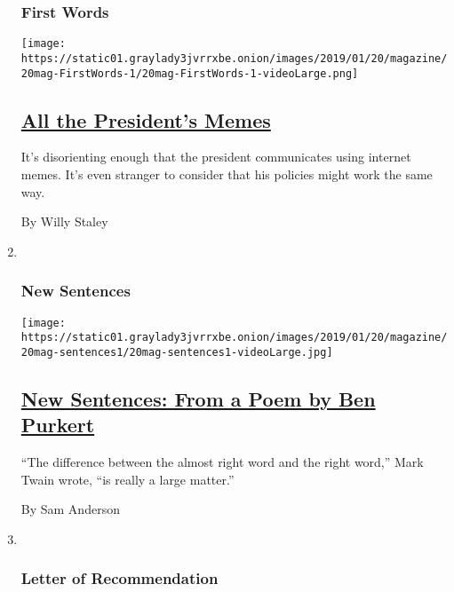 \begin{enumerate}
{  \subsubsection{First Words}\label{first-words}}

  \texttt{[image: https://static01.graylady3jvrrxbe.onion/images/2019/01/20/magazine/20mag-FirstWords-1/20mag-FirstWords-1-videoLarge.png]}

  \hypertarget{all-the-presidents-memes}{%
  \subsection{\texorpdfstring{\href{/2019/01/14/magazine/all-the-presidents-memes.html}{All
  the President's
  Memes}}{All the President's Memes}}\label{all-the-presidents-memes}}

  It's disorienting enough that the president communicates using
  internet memes. It's even stranger to consider that his policies might
  work the same way.

  By Willy Staley
\item ~
  \hypertarget{new-sentences}{%
  \subsubsection{New Sentences}\label{new-sentences}}

  \texttt{[image: https://static01.graylady3jvrrxbe.onion/images/2019/01/20/magazine/20mag-sentences1/20mag-sentences1-videoLarge.jpg]}

  \hypertarget{new-sentences-from-a-poem-by-ben-purkert}{%
  \subsection{\texorpdfstring{\href{/2019/01/18/magazine/new-sentences-from-a-poem-by-ben-purkert.html}{New
  Sentences: From a Poem by Ben
  Purkert}}{New Sentences: From a Poem by Ben Purkert}}\label{new-sentences-from-a-poem-by-ben-purkert}}

  ``The difference between the almost right word and the right word,''
  Mark Twain wrote, ``is really a large matter.''

  By Sam Anderson
\item ~
  \hypertarget{letter-of-recommendation}{%
  \subsubsection{Letter of
  Recommendation}\label{letter-of-recommendation}}


\end{enumerate}
